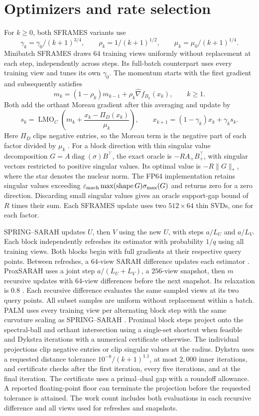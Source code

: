 \documentclass[11pt]{article}
\begin{document}
\section{Optimizers and rate selection}
For \(k\ge0\), both SFRAMES variants use
\[
  \gamma_k=\gamma_0/(k+1)^{3/4},\qquad
  \rho_k=1/(k+1)^{1/2},\qquad
  \mu_k=\mu_0/(k+1)^{1/4}.
\]
Minibatch SFRAMES draws 64
training views uniformly without replacement at each step, independently across
steps. Its full-batch
counterpart uses every training view and tunes its own \(\gamma_0\). The
momentum starts with the first gradient and subsequently satisfies
\[
  m_k=(1-\rho_k)m_{k-1}+\rho_k\widehat\nabla f_{B_k}(x_k),\qquad k\ge1.
\]
Both add the orthant Moreau gradient after this averaging and update by
\[
  s_k=\operatorname{LMO}_C\!\left(m_k+
       \frac{x_k-\Pi_D(x_k)}{\mu_k}\right),\qquad
  x_{k+1}=(1-\gamma_k)x_k+\gamma_k s_k.
\]
Here \(\Pi_D\) clips negative entries, so the Moreau term is the negative
part of each factor divided by \(\mu_k\) \cite{sframes}.
For a block direction with thin singular
value decomposition \(G=A\operatorname{diag}(\sigma)B^\top\), the exact
oracle is \(-RA_+B_+^\top\), with singular vectors restricted to positive
singular values. Its optimal value is \(-R\|G\|_*\), where the star denotes
the nuclear norm. The FP64 implementation retains singular values exceeding
\(\varepsilon_{\rm mach}\max(\operatorname{shape}G)\sigma_{\max}(G)\)
and returns zero for a zero direction. Discarding small singular values gives
an oracle support-gap bound of \(R\) times their sum. Each SFRAMES update
uses two \(512\times64\) thin SVDs, one for each factor.

SPRING--SARAH updates \(U\), then \(V\) using the new \(U\), with steps
\(a/L_U\) and \(a/L_V\). Each block independently refreshes its estimator
with probability \(1/q\) using all training views. Both blocks begin with
full gradients at their respective query points. Between refreshes, a
\(64\)-view SARAH difference updates each estimator \cite{spring}.
ProxSARAH uses a joint step \(a/(L_U+L_V)\), a \(256\)-view snapshot,
then \(m\) recursive updates with \(64\)-view differences before the next
snapshot. Its relaxation is \(0.8\) \cite{proxsarah}. Each recursive
difference evaluates the same sampled views at its two query points. All
subset samples are uniform without replacement within a batch.
PALM uses every training view per alternating block step with the same
curvature scaling as SPRING--SARAH \cite{palm}. Proximal block steps
project onto the spectral-ball and orthant intersection using a single-set
shortcut when feasible and Dykstra iterations with a numerical certificate otherwise.
The individual projections clip negative entries or clip singular values at
the radius. Dykstra uses a requested distance tolerance
\(10^{-8}/(k+1)^{1.1}\), at most \(2{,}000\) inner iterations,
and certificate checks after the first iteration, every five iterations, and
at the final iteration. The certificate uses a primal--dual gap with a
roundoff allowance. A reported floating-point floor can terminate the
projection before the requested tolerance is attained.
The work count includes both evaluations in each recursive difference and all
views used for refreshes and snapshots.
\end{document}
